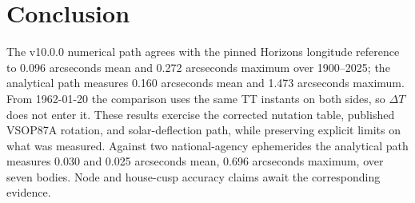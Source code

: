 \documentclass[11pt]{article}
\begin{document}
\section{Conclusion}

The v10.0.0 numerical path agrees with the pinned Horizons longitude reference to
0.096 arcseconds mean and 0.272 arcseconds maximum over 1900--2025;
the analytical path measures 0.160 arcseconds mean and 1.473 arcseconds maximum.
From 1962-01-20 the comparison uses the same TT instants on both sides, so
$\Delta T$ does not enter it. These results exercise the corrected nutation
table, published VSOP87A rotation, and solar-deflection path, while preserving
explicit limits on what was measured. Against two national-agency ephemerides the
analytical path measures 0.030 and 0.025 arcseconds mean, 0.696 arcseconds maximum, over
seven bodies. Node and house-cusp accuracy claims await the corresponding evidence.



\end{document}
